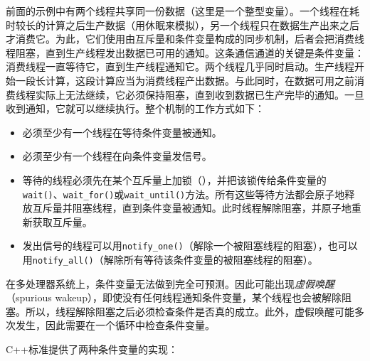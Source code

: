 
前面的示例中有两个线程共享同一份数据（这里是一个整型变量）。一个线程在耗时较长的计算之后生产数据（用休眠来模拟），另一个线程只在数据生产出来之后才消费它。为此，它们使用由互斥量和条件变量构成的同步机制，后者会把消费线程阻塞，直到生产线程发出数据已可用的通知。这条通信通道的关键是条件变量：消费线程一直等待它，直到生产线程通知它。两个线程几乎同时启动。生产线程开始一段长计算，这段计算应当为消费线程产出数据。与此同时，在数据可用之前消费线程实际上无法继续，它必须保持阻塞，直到收到数据已生产完毕的通知。一旦收到通知，它就可以继续执行。整个机制的工作方式如下：



\begin{itemize}
\item 必须至少有一个线程在等待条件变量被通知。



\item 必须至少有一个线程在向条件变量发信号。



\item 等待的线程必须先在某个互斥量上加锁（），并把该锁传给条件变量的\texttt{wait()}、\texttt{wait\_\allowbreak{}for()}或\texttt{wait\_\allowbreak{}until()}方法。所有这些等待方法都会原子地释放互斥量并阻塞线程，直到条件变量被通知。此时线程解除阻塞，并原子地重新获取互斥量。



\item 发出信号的线程可以用\texttt{notify\_\allowbreak{}one()}（解除一个被阻塞线程的阻塞），也可以用\texttt{notify\_\allowbreak{}all()}（解除所有等待该条件变量的被阻塞线程的阻塞）。

\end{itemize}



\begin{myNote}
在多处理器系统上，条件变量无法做到完全可预测。因此可能出现\textit{虚假唤醒}（spurious wakeup），即使没有任何线程通知条件变量，某个线程也会被解除阻塞。所以，线程解除阻塞之后必须检查条件是否真的成立。此外，虚假唤醒可能多次发生，因此需要在一个循环中检查条件变量。
\end{myNote}



C++标准提供了两种条件变量的实现：



